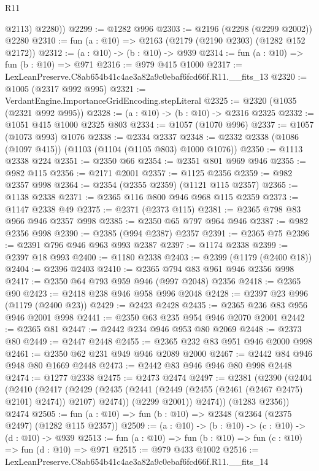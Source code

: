 \begin{lexlean}{R11}
\begin{coremodule}
          @2113)
        @2280))
@2299 := @1282 @996
@2303 := @2196 (@2298 (@2299 @2002)) @2280
@2310 := fun (a : @10) => @2163 (@2179 (@2190 @2303) (@1282 @152 @2172))
@2312 := (a : @10) -> (b : @10) -> @939
@2314 := fun (a : @10) => fun (b : @10) => @971
@2316 := @979 @415 @1000
@2317 := LexLeanPreserve.C8ab654b41c4ae3a82a9c0ebaf6fcd66f.R11.__fits_13
@2320 := @1005 (@2317 @992 @995)
@2321 := VerdantEngine.ImportanceGridEncoding.stepLiteral
@2325 := @2320 (@1035 (@2321 @992 @995))
@2328 := (a : @10) -> (b : @10) -> @2316 @2325
@2332 := @1051 @415 @1000 @2325 @803
@2334 := @1057 (@1070 @996)
@2337 := @1057 (@1073 @993) @1076
@2338 := @2334 @2337
@2348 := @2332 @2338 (@1086 (@1097 @415)) (@1103 (@1104 (@1105 @803) @1000 @1076))
@2350 := @1113 @2338 @224
@2351 := @2350 @66
@2354 := @2351 @801 @969 @946
@2355 := @982 @115
@2356 := @2171 @2001
@2357 := @1125 @2356
@2359 := @982 @2357 @998
@2364 := @2354 (@2355 @2359) (@1121 @115 @2357)
@2365 := @1138 @2338
@2371 := @2365 @116 @800 @946 @968 @115 @2359
@2373 := @1147 @2338 @49
@2375 := @2371 (@2373 @115)
@2381 := @2365 @798 @83 @966 @946 @2357 @998
@2385 := @2350 @65 @797 @964 @946
@2387 := @982 @2356 @998
@2390 := @2385 (@994 @2387) @2357
@2391 := @2365 @75
@2396 := @2391 @796 @946 @963 @993 @2387
@2397 := @1174 @2338
@2399 := @2397 @18 @993
@2400 := @1180 @2338
@2403 := @2399 (@1179 (@2400 @18))
@2404 := @2396 @2403
@2410 := @2365 @794 @83 @961 @946 @2356 @998
@2417 := @2350 @64 @793 @959 @946 (@997 @2048) @2356
@2418 := @2365 @90
@2423 := @2418 @238 @946 @958 @996 @2048
@2428 := @2397 @23 @996 (@1179 (@2400 @23))
@2429 := @2423 @2428
@2435 := @2365 @236 @83 @956 @946 @2001 @998
@2441 := @2350 @63 @235 @954 @946 @2070 @2001
@2442 := @2365 @81
@2447 := @2442 @234 @946 @953 @80 @2069
@2448 := @2373 @80
@2449 := @2447 @2448
@2455 := @2365 @232 @83 @951 @946 @2000 @998
@2461 := @2350 @62 @231 @949 @946 @2089 @2000
@2467 := @2442 @84 @946 @948 @80 @1669 @2448
@2473 := @2442 @83 @946 @946 @80 @998 @2448
@2474 := @1277 @2338
@2475 := @2473 @2474
@2497 := @2381
    (@2390
      (@2404
        (@2410
          (@2417
            (@2429 (@2435 (@2441 (@2449 (@2455 (@2461 (@2467 @2475) @2101) @2474)) @2107) @2474))
            (@2299 @2001))
          @2474))
      (@1283 @2356))
    @2474
@2505 := fun (a : @10) => fun (b : @10) => @2348 (@2364 (@2375 @2497) (@1282 @115 @2357))
@2509 := (a : @10) -> (b : @10) -> (c : @10) -> (d : @10) -> @939
@2513 := fun (a : @10) => fun (b : @10) => fun (c : @10) => fun (d : @10) => @971
@2515 := @979 @433 @1002
@2516 := LexLeanPreserve.C8ab654b41c4ae3a82a9c0ebaf6fcd66f.R11.__fits_14

\end{coremodule}
\end{lexlean}
